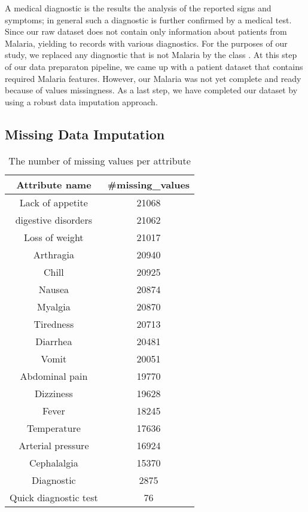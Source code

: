 A medical diagnostic is the results the analysis of the reported signs and symptoms; in general such a diagnostic is further confirmed by a medical test.
Since our raw dataset does not contain only information about patients from Malaria, yielding to records with various diagnostics. For the purposes of 
our study, we replaced any diagnostic that is not Malaria by the class . At this step of our data preparaton pipeline, we came 
up with a patient dataset that contains required Malaria features. However, our Malaria was not yet complete and ready because of values missingness.
As a last step, we have completed our dataset by using a robust data imputation approach.


\subsection{Missing Data Imputation}


\begin{table}[!ht]
\centering
\begin{tabular}{cc}
\textbf{Attribute name} & \textbf{\#missing\_values}\\
\toprule
Lack of appetite &    21068 \\
digestive disorders & 21062 \\
Loss of weight &   21017 \\
Arthragia &     20940\\
Chill &      20925\\
Nausea &     20874\\
Myalgia &    20870\\
Tiredness&   20713 \\
Diarrhea &     20481\\
Vomit &        20051 \\
Abdominal pain &  19770 \\
Dizziness &       19628 \\
Fever &        18245 \\
Temperature &     17636 \\
Arterial pressure &    16924 \\
Cephalalgia &       15370 \\
Diagnostic  &     2875 \\
Quick diagnostic test &  76 \\
\bottomrule
\end{tabular}
\vspace*{.5cm}
\caption{The number of missing values per attribute}\label{table-missing}
\end{table} 
